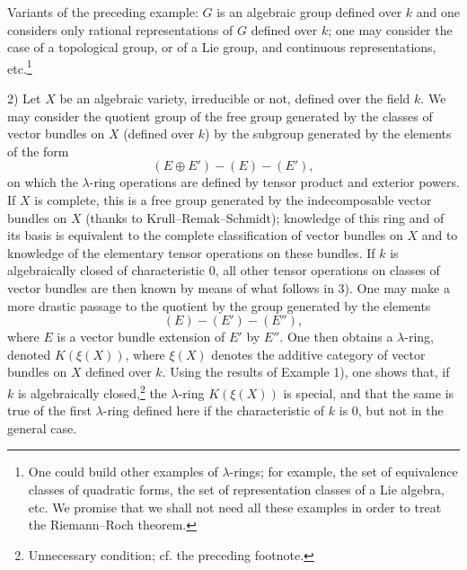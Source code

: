 \documentclass[11pt]{article}
\begin{document}
Variants of the preceding example: $G$ is an algebraic group defined over $k$ and one considers only rational representations of $G$ defined over $k$; one may consider the case of a topological group, or of a Lie group, and continuous representations, etc.\footnote{One could build other examples of $\lambda$-rings; for example, the set of equivalence classes of quadratic forms, the set of representation classes of a Lie algebra, etc. We promise that we shall not need all these examples in order to treat the Riemann--Roch theorem.}

2) Let $X$ be an algebraic variety, irreducible or not, defined over the field $k$. We may consider the quotient group of the free group generated by the classes of vector bundles on $X$ (defined over $k$) by the subgroup generated by the elements of the form
\[
(E\oplus E')-(E)-(E'),
\]
on which the $\lambda$-ring operations are defined by tensor product and exterior powers. If $X$ is complete, this is a free group generated by the indecomposable vector bundles on $X$ (thanks to Krull--Remak--Schmidt); knowledge of this ring and of its basis is equivalent to the complete classification of vector bundles on $X$ and to knowledge of the elementary tensor operations on these bundles. If $k$ is algebraically closed of characteristic $0$, all other tensor operations on classes of vector bundles are then known by means of what follows in 3). One may make a more drastic passage to the quotient by the group generated by the elements
\[
(E)-(E')-(E''),
\]
where $E$ is a vector bundle extension of $E'$ by $E''$. One then obtains a $\lambda$-ring, denoted $K(\xi(X))$, where $\xi(X)$ denotes the additive category of vector bundles on $X$ defined over $k$. Using the results of Example 1), one shows that, if $k$ is algebraically closed,\footnote{Unnecessary condition; cf. the preceding footnote.} the $\lambda$-ring $K(\xi(X))$ is special, and that the same is true of the first $\lambda$-ring defined here if the characteristic of $k$ is $0$, but not in the general case.
\end{document}
